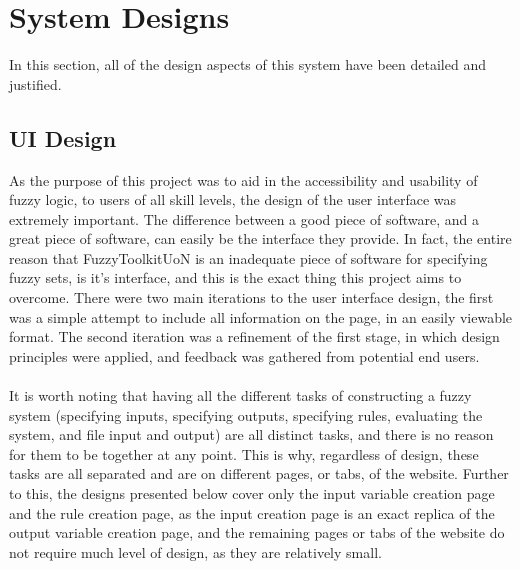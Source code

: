 \section{System Designs}
In this section, all of the design aspects of this system have been detailed and justified. 

\subsection{UI Design}
As the purpose of this project was to aid in the accessibility and usability of fuzzy logic, to users of all skill levels, the design of the user interface was extremely important. The difference between a good piece of software, and a great piece of software, can easily be the interface they provide. In fact, the entire reason that FuzzyToolkitUoN is an inadequate piece of software for specifying fuzzy sets, is it's interface, and this is the exact thing this project aims to overcome. There were two main iterations to the user interface design, the first was a simple attempt to include all information on the page, in an easily viewable format. The second iteration was a refinement of the first stage, in which design principles were applied, and feedback was gathered from potential end users. \ \\
\ \\
It is worth noting that having all the different tasks of constructing a fuzzy system (specifying inputs, specifying outputs, specifying rules, evaluating the system, and file input and output) are all distinct tasks, and there is no reason for them to be together at any point. This is why, regardless of design, these tasks are all separated and are on different pages, or tabs, of the website. Further to this, the designs presented below cover only the input variable creation page and the rule creation page, as the input creation page is an exact replica of the output variable creation page, and the remaining pages or tabs of the website do not require much level of design, as they are relatively small.

